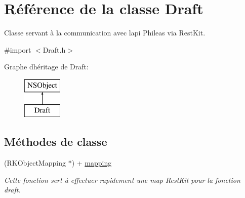 \hypertarget{interface_draft}{}\section{Référence de la classe Draft}
\label{interface_draft}


Classe servant à la communication avec l\textquotesingle{}api Phileas via Rest\+Kit.  




{\ttfamily \#import $<$Draft.\+h$>$}

Graphe d\textquotesingle{}héritage de Draft\+:\begin{figure}[H]
\begin{center}
\leavevmode
\includegraphics[height=2.000000cm]{interface_draft}
\end{center}
\end{figure}
\subsection*{Méthodes de classe}
\begin{DoxyCompactItemize}
\item 
(R\+K\+Object\+Mapping $\ast$) + \hyperlink{interface_draft_a876a5d2d38d738f3509b224dac791a4b}{mapping}
\begin{DoxyCompactList}\small\item\em Cette fonction sert à effectuer rapidement une map Rest\+Kit pour la fonction draft. \end{DoxyCompactList}\end{DoxyCompactItemize}
